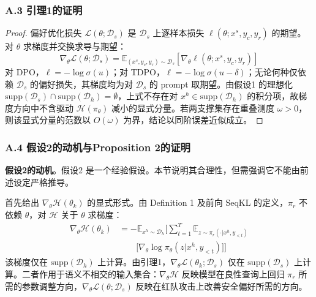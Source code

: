 \documentclass[lettersize,journal]{IEEEtran}
\begin{document}
\subsubsection*{A.3 引理1的证明}\label{app:3}
\begin{proof}
偏好优化损失 $\mathcal{L}(\theta; \mathcal{D}_s)$ 是 $\mathcal{D}_s$ 上逐样本损失 $\ell(\theta; x^s, y_c, y_r)$ 的期望。对 $\theta$ 求梯度并交换求导与期望：
\begin{equation}
    \nabla_{\theta} \mathcal{L}(\theta; \mathcal{D}_s) = \mathbb{E}_{(x^s, y_c, y_r) \sim \mathcal{D}_s} \left[ \nabla_{\theta} \ell(\theta; x^s, y_c, y_r) \right]
\end{equation}
对 DPO，$\ell = -\log\sigma(u)$；对 TDPO，$\ell = -\log\sigma(u - \delta)$；无论何种仅依赖 $\mathcal{D}_s$ 的偏好损失，其梯度均为对 $\mathcal{D}_s$ 的 prompt 取期望。由假设1 的理想化 $\mathrm{supp}(\mathcal{D}_s) \cap \mathrm{supp}(\mathcal{D}_h) = \emptyset$，上式不存在对 $x^h \in \mathrm{supp}(\mathcal{D}_h)$ 的积分项，故梯度方向中不含驱动 $\mathcal{H}(\pi_{\theta})$ 减小的显式分量。若两支撑集存在重叠测度 $\omega > 0$，则该显式分量的范数以 $O(\omega)$ 为界，结论以同阶误差近似成立。
\end{proof}
 
\subsubsection*{A.4 假设2的动机与Proposition 2的证明}\label{app:4}
 
\textbf{假设2的动机}。假设2 是一个经验假设。本节说明其合理性，但需强调它不能由前述设定严格推导。
 
首先给出 $\nabla_\theta \mathcal{H}(\theta_k)$ 的显式形式。由 Definition 1 及前向 SeqKL 的定义，$\pi_r$ 不依赖 $\theta$，对 $\mathcal{H}$ 关于 $\theta$ 求梯度：
\begin{equation}
\begin{aligned}
\nabla_\theta \mathcal{H}(\theta_k) 
&= -\mathbb{E}_{x^h \sim \mathcal{D}_h}\bigg[\sum_{t=1}^T 
\mathbb{E}_{z \sim \pi_r(\cdot|x^h, y_{<t})} \\
&\qquad \big[\nabla_\theta \log\pi_\theta(z|x^h, y_{<t})\big]\bigg]
\end{aligned}
\end{equation}
该梯度仅在 $\mathrm{supp}(\mathcal{D}_h)$ 上计算。由引理1，$\nabla_\theta \mathcal{L}(\theta_k; \mathcal{D}_s)$ 仅在 $\mathrm{supp}(\mathcal{D}_s)$ 上计算。二者作用于语义不相交的输入集合：$\nabla_\theta \mathcal{H}$ 反映模型在良性查询上回归 $\pi_r$ 所需的参数调整方向，$\nabla_\theta \mathcal{L}(\theta; \mathcal{D}_s)$ 反映在红队攻击上改善安全偏好所需的方向。
 
\end{document}
